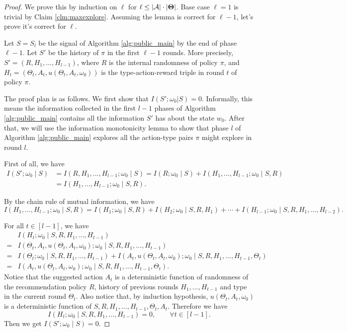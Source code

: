 \begin{proof}
We prove this by induction on $\ell$ for $\ell \leq |\mathcal{A}|\cdot |\bold{\Theta}|$. Base case $\ell=1$ is trivial by Claim \ref{clm:maxexplore}. Assuming the lemma is correct for $\ell-1$, let's prove it's correct for $\ell$.

Let $S= S_l$ be the signal of Algorithm \ref{alg:public_main} by the end of phase $\ell-1$.  Let $S'$ be the history of $\pi$ in the first $\ell-1$ rounds. More precisely,
    $S' = (R, H_1,...,H_{l-1})$,
where $R$ is the internal randomness of policy $\pi$, and
    $H_t = (\Theta_t, A_t, u(\Theta_t, A_t, \omega_0))$
is the type-action-reward triple in round $t$ of policy $\pi$.

The proof plan is as follows. We first show that $I(S';\omega_0|S) =0 $. Informally, this means the information collected in the first $l-1$ phases of Algorithm \ref{alg:public_main} contains all the information $S'$ has about the state $w_0$. After that, we will use the information monotonicity lemma to show that phase $l$ of Algorithm \ref{alg:public_main} explores all the action-type pairs $\pi$ might explore in round $l$.

First of all, we have
\begin{align*}
I(S'; \omega_0\mid  S)
    &= I(R,H_1,...,H_{l-1}; \omega_0\mid  S)
    = I(R; \omega_0\mid  S) + I(H_1,...,H_{l-1}; \omega_0\mid S, R) \\
    &= I(H_1,...,H_{l-1}; \omega_0\mid S, R).
\end{align*}

By the chain rule of mutual information, we have
\[
 I(H_1,...,H_{l-1}; \omega_0\mid S, R) = I(H_1;\omega_0\mid S,R) + I(H_2;\omega_0\mid S, R ,H_1) + \cdots + I(H_{l-1}; \omega_0\mid S,R,H_1,...,H_{l-2}).
\]

For all $t \in [l-1]$, we have
\begin{align*}
&I(H_t; \omega_0\mid S,R,H_1,...,H_{t-1}) \\
=& I(\Theta_t, A_t, u(\Theta_t, A_t, \omega_0); \omega_0\mid S,R,H_1,...,H_{t-1}) \\
=& I(\Theta_t ; \omega_0\mid S,R,H_1,...,H_{t-1}) +  I(A_t, u(\Theta_t, A_t, \omega_0); \omega_0\mid S,R,H_1,...,H_{t-1},\Theta_t) \\
=& I(A_t, u(\Theta_t, A_t, \omega_0); \omega_0\mid S,R,H_1,...,H_{t-1},\Theta_t).
\end{align*}
Notice that the suggested action $A_t$ is a deterministic function of randomness of the recommendation policy $R$,  history of previous rounds $H_1,...,H_{t-1}$ and type in the current round $\Theta_t$. Also notice that, by induction hypothesis, $u(\Theta_t, A_t, \omega_0)$ is a deterministic function of $S,R,H_1,...,H_{t-1},\Theta_t, A_t$. Therefore we have
\[
I(H_t; \omega_0\mid S,R,H_1,...,H_{t-1}) = 0, \qquad \forall t \in [l-1].
\]
Then we get
$ I(S'; \omega_0 \mid  S) = 0.$


\end{proof}
